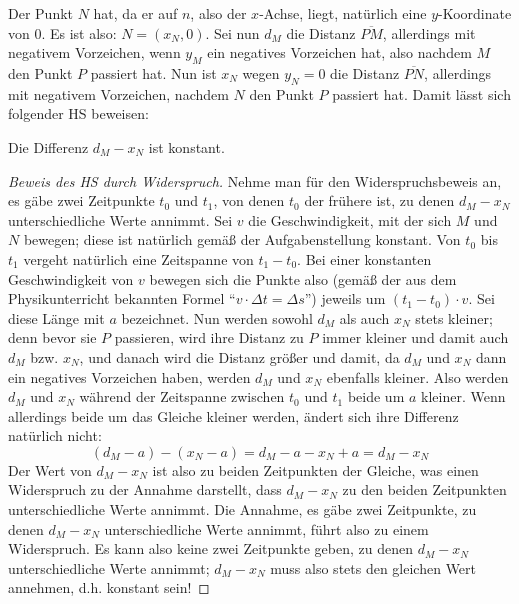 Der Punkt $N$ hat, da er auf $n$, also der $x$-Achse, liegt, natürlich eine $y$-Koordinate von 0. Es ist also: 
$N=(x_N, 0)$. Sei nun $d_M$ die Distanz $\overline{PM}$, allerdings mit negativem Vorzeichen, wenn $y_M$ ein 
negatives Vorzeichen hat, also nachdem $M$ den Punkt $P$ passiert hat. Nun ist $x_N$ wegen $y_N=0$ die Distanz 
$\overline{PN}$, allerdings mit negativem Vorzeichen, nachdem $N$ den Punkt $P$ passiert hat. Damit lässt sich folgender 
HS beweisen:
\begin{lem}
    Die Differenz $d_M-x_N$ ist konstant.
\end{lem}
\begin{proof}[Beweis des HS durch Widerspruch]
    \renewcommand{\qedsymbol}{$\square$}
    Nehme man für den Widerspruchsbeweis an, es gäbe zwei Zeitpunkte $t_0$ und $t_1$, von denen $t_0$ der frühere ist, 
    zu denen $d_M-x_N$ unterschiedliche Werte annimmt. Sei $v$ die Geschwindigkeit, mit der sich $M$ und $N$ bewegen; 
    diese ist natürlich gemäß der Aufgabenstellung konstant. Von $t_0$ bis $t_1$ vergeht natürlich eine Zeitspanne 
    von $t_1-t_0$. Bei einer konstanten Geschwindigkeit von $v$ bewegen sich die Punkte also (gemäß der aus dem 
    Physikunterricht bekannten Formel "`$v \cdot\Delta t=\Delta s$"') jeweils um $(t_1-t_0)\cdot v$. 
    Sei diese Länge mit $a$ bezeichnet. Nun werden sowohl $d_M$ als auch $x_N$ stets kleiner; denn bevor sie $P$ passieren, wird ihre Distanz zu $P$ immer 
    kleiner und damit auch $d_M$ bzw. $x_N$, und danach wird die Distanz größer und damit, da $d_M$ und $x_N$ dann 
    ein negatives Vorzeichen haben, werden $d_M$ und $x_N$ ebenfalls kleiner. Also werden $d_M$ und $x_N$ während 
    der Zeitspanne zwischen $t_0$ und $t_1$ beide um $a$ kleiner. Wenn allerdings beide um das Gleiche kleiner 
    werden, ändert sich ihre Differenz natürlich nicht:
    \[
        (d_M-a)-(x_N-a)=d_M-a-x_N+a=d_M-x_N
    \]
    Der Wert von $d_M-x_N$ ist also zu beiden Zeitpunkten der Gleiche, was einen Widerspruch zu der Annahme darstellt, 
    dass $d_M-x_N$ zu den beiden Zeitpunkten unterschiedliche Werte annimmt. Die Annahme, es gäbe zwei Zeitpunkte, zu 
    denen $d_M-x_N$ unterschiedliche Werte annimmt, führt also zu einem Widerspruch. Es kann also keine zwei 
    Zeitpunkte geben, zu denen $d_M-x_N$ unterschiedliche Werte annimmt; $d_M-x_N$ muss also stets den gleichen Wert 
    annehmen, d.h. konstant sein!
\end{proof}


